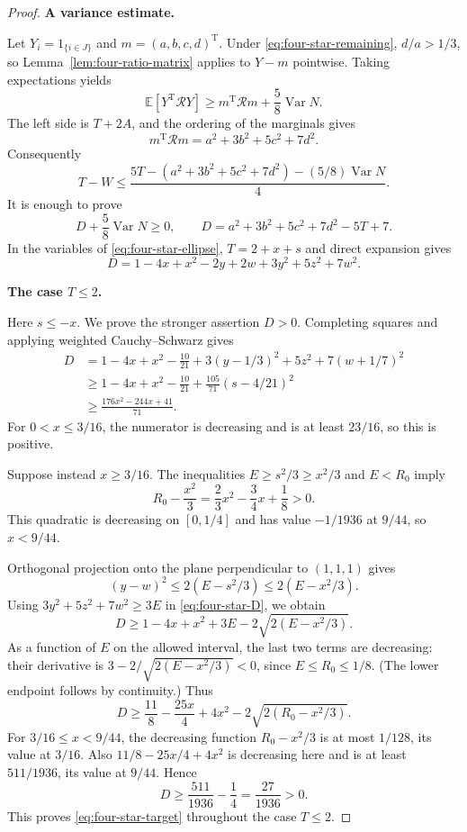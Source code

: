\begin{proof}
\medskip\noindent\textbf{A variance estimate.}

Let $Y_i=1_{\{i\in J\}}$ and $m=(a,b,c,d)^{\mathrm T}$.
Under \eqref{eq:four-star-remaining}, $d/a>1/3$, so Lemma~\ref{lem:four-ratio-matrix} applies to
$Y-m$ pointwise.  Taking expectations yields
\[
 \mathbb E[Y^{\mathrm T}\mathcal RY]
 \ge m^{\mathrm T}\mathcal Rm+\frac58\operatorname{Var}N.
\]
The left side is $T+2A$, and the ordering of the marginals gives
\[
 m^{\mathrm T}\mathcal Rm=a^2+3b^2+5c^2+7d^2.
\]
Consequently
\begin{equation}\label{eq:four-star-variance-bound}
 T-W\le
 \frac{5T-(a^2+3b^2+5c^2+7d^2)-(5/8)\operatorname{Var}N}{4}.
\end{equation}
It is enough to prove
\begin{equation}\label{eq:four-star-target}
 D+\frac58\operatorname{Var}N\ge0,
 \qquad
 D=a^2+3b^2+5c^2+7d^2-5T+7.
\end{equation}
In the variables of \eqref{eq:four-star-ellipse}, $T=2+x+s$ and
direct expansion gives
\begin{equation}\label{eq:four-star-D}
 D=1-4x+x^2-2y+2w+3y^2+5z^2+7w^2.
\end{equation}

\medskip\noindent\textbf{The case $T\le2$.}

Here $s\le-x$.  We prove the stronger assertion $D>0$.
Completing squares and applying weighted Cauchy--Schwarz gives
\[
 \begin{split}
 D&=1-4x+x^2-\frac{10}{21}
       +3(y-1/3)^2+5z^2+7(w+1/7)^2\\
 &\ge1-4x+x^2-\frac{10}{21}
       +\frac{105}{71}(s-4/21)^2\\
 &\ge\frac{176x^2-244x+41}{71}.
 \end{split}
\]
For $0<x\le3/16$, the numerator is decreasing and is at least
$23/16$, so this is positive.

Suppose instead $x\ge3/16$.  The inequalities
$E\ge s^2/3\ge x^2/3$ and $E<R_0$ imply
\[
 R_0-\frac{x^2}{3}
 =\frac23x^2-\frac34x+\frac18>0.
\]
This quadratic is decreasing on $[0,1/4]$ and has value
$-1/1936$ at $9/44$, so $x<9/44$.

Orthogonal projection onto the plane perpendicular to $(1,1,1)$
gives
\[
 (y-w)^2\le2(E-s^2/3)\le2(E-x^2/3).
\]
Using $3y^2+5z^2+7w^2\ge3E$ in \eqref{eq:four-star-D}, we obtain
\[
 D\ge1-4x+x^2+3E-2\sqrt{2(E-x^2/3)}.
\]
As a function of $E$ on the allowed interval, the last two terms
are decreasing: their derivative is
$3-2/\sqrt{2(E-x^2/3)}<0$, since $E\le R_0\le1/8$.
(The lower endpoint follows by continuity.)
Thus
\[
 D\ge\frac{11}{8}-\frac{25x}{4}+4x^2
       -2\sqrt{2(R_0-x^2/3)}.
\]
For $3/16\le x<9/44$, the decreasing function
$R_0-x^2/3$ is at most $1/128$, its value at $3/16$.
Also $11/8-25x/4+4x^2$ is decreasing here and is at least
$511/1936$, its value at $9/44$.  Hence
\[
 D\ge\frac{511}{1936}-\frac14=\frac{27}{1936}>0.
\]
This proves \eqref{eq:four-star-target} throughout the case $T\le2$.


\end{proof}
